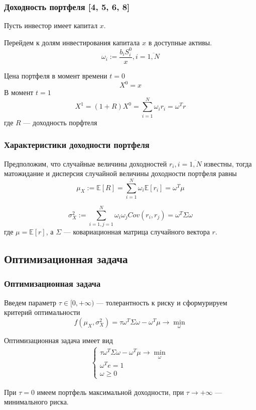 \documentclass{beamer}
\newcommand{\E}[1]{\mathbb{E}\left[#1\right]} %
\newcommand{\COV}[2]{Cov\left(#1, #2\right)}
\begin{document}
\begin{frame}
    \frametitle{Доходность портфеля [4, 5, 6, 8]}
    Пусть инвестор имеет капитал $x$.

    Перейдем к долям инвестирования капитала $x$ в доступные активы.
    \[
        \omega_i := \frac{b_i S_i^0}{x}, i=\overline{1, N}
    \]

    Цена портфеля в момент времени $t=0$
    \[
        X^0 = x
    \]
    В момент $t=1$
    \[
        X^1 = (1+R)X^0 = \sum_{i=1}^{N} \omega_i r_i = \omega^T r
    \]
    где $R$ --- доходность порфтеля
\end{frame}

\begin{frame}
    \frametitle{Характеристики доходности портфеля}

    Предположим, что случайные величины доходностей $r_i, i=\overline{1, N}$ известны, тогда
    матожидание и дисперсия случайной величины доходности портфеля равны
    \[
        \mu_X := \E{R} = \sum_{i=1}^{N} \omega_i \E{r_i} = \omega^T \mu
    \]

    \[
        \sigma_X^2 := \sum_{i=1, j=1}^{N} \omega_i \omega_j \COV{r_i}{r_j} =
        \omega^T \Sigma \omega
    \]
    где $\mu = \E{r}$, а $\Sigma$ --- ковариационная матрица случайного вектора $r$.
\end{frame}

\subsection{Оптимизационная задача}

\begin{frame}
    \frametitle{Оптимизационная задача}
    Введем параметр $\tau \in [0, +\infty)$ --- толерантность к риску и сформурируем критерий оптимальности
    \[ 
        f(\mu_X, \sigma_X^2) = \tau \omega^T \Sigma \omega - \omega^T \mu \rightarrow \min_{\omega}
    \]

    Оптимизационная задача имеет вид
    \begin{align*}
        \begin{cases}
            \tau \omega^T \Sigma \omega - \omega^T \mu \rightarrow \min_{\omega} \\
            \omega^T e = 1 \\
            \omega \ge 0
        \end{cases}
    \end{align*}

    При $\tau=0$ имеем портфель максимальной доходности, при $\tau \rightarrow +\infty$
    --- минимального риска.
\end{frame}
\end{document}
